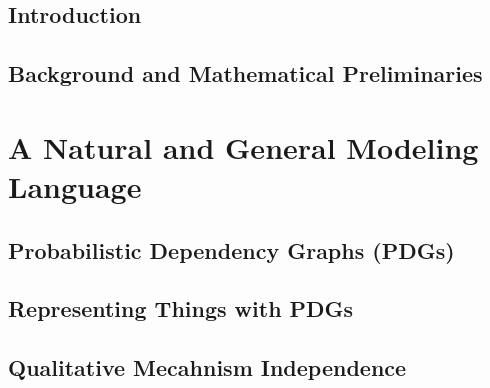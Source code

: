 \documentclass[tocprelim,
    ]{cornellmodified}
\begin{document}
\chapter{Introduction}
    
\chapter{Background and Mathematical Preliminaries}
    

\part{A Natural and General Modeling Language}
    \label{part:univ-model}

\chapter{Probabilistic Dependency Graphs (PDGs)} 
    
    
\chapter{Representing Things with PDGs}
    
     
\chapter{Qualitative Mecahnism Independence}
    

\end{document}
